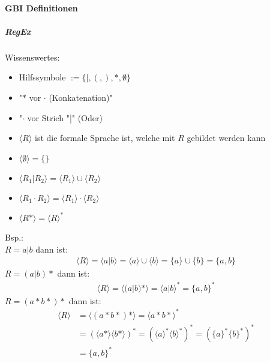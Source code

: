 \documentclass[12pt]{article}
\begin{document}
\paragraph{GBI Definitionen}
\subparagraph{RegEx}
\begin{flushleft}
    Wissenswertes:
    \begin{itemize}
        \item Hilfssymbole $:= \{|,(,),\ast,\emptyset\}$
        \item "$\ast$ vor $\cdot$ (Konkatenation)"
        \item "$\cdot$ vor Strich "|" (Oder)
        \item $\langle R \rangle$ ist die formale Sprache ist, welche mit $R$ gebildet werden kann
        \item $\langle \emptyset \rangle = \{\}$
        \item $\langle R_1| R_2 \rangle = \langle R_1 \rangle \cup \langle R_2 \rangle$
        \item $\langle R_1 \cdot R_2 \rangle =\langle R_1 \rangle \cdot \langle R_2 \rangle$
        \item $\langle R \ast \rangle = \langle R \rangle ^\ast$
    \end{itemize}
    Bsp.: \\
    $R = a|b$ dann ist:
    \begin{align*}
        \langle R \rangle = \langle a | b \rangle = \langle a \rangle \cup \langle b \rangle = \{a\} \cup \{b\} = \{a,b\}
    \end{align*}
    $R = (a|b)\ast$ dann ist:
    \begin{align*}
        \langle R \rangle = \langle (a|b)\ast \rangle = \langle a | b \rangle^\ast = \{a,b\}^\ast
    \end{align*}
    $R = (a\ast b\ast)\ast$ dann ist:
    \begin{align*}
        \langle R \rangle &= \langle (a\ast b\ast)\ast \rangle = \langle a\ast b\ast\rangle^\ast \\
        &= (\langle a\ast\rangle\langle b\ast\rangle)^\ast = (\langle a\rangle^\ast\langle b\rangle^\ast)^\ast = (\{a\}^\ast\{b\}^\ast)^\ast \\
        &= \{a,b\}^\ast
    \end{align*}
\end{flushleft}
\end{document}

